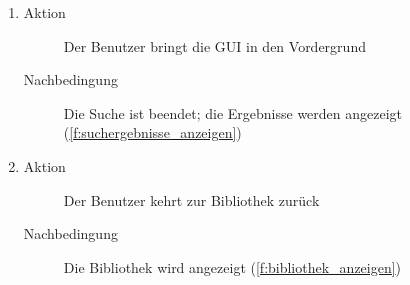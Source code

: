 \begin{enumerate} [label=\bfseries /TSW \arabic*0/, leftmargin=*]
\begin{enumerate}
\begin{description}
			\item[Nachbedingung] Es ist ein Signalton zu hören (\ref{fw:signalton})
		\end{description}
		\item
		\begin{description}
			\item[Aktion] Der Benutzer bringt die GUI in den Vordergrund
			\item[Nachbedingung] Die Suche ist beendet; die Ergebnisse werden angezeigt (\ref{f:suchergebnisse_anzeigen})
		\end{description}
		\item
		\begin{description}
			\item[Aktion] Der Benutzer kehrt zur Bibliothek zurück
			\item[Nachbedingung] Die Bibliothek wird angezeigt (\ref{f:bibliothek_anzeigen})
		\end{description}


\end{enumerate}
\end{enumerate}
